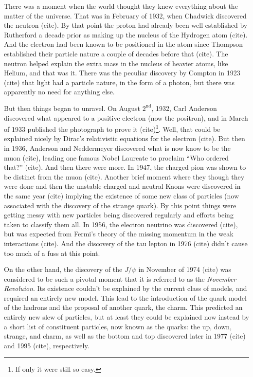 There was a moment when the world thought they knew everything
about the matter of the universe. That was in February of 1932, when Chadwick discovered the
neutron (cite). By that point the proton had already been 
well established by Rutherford a decade prior as 
making up the nucleus of the Hydrogen
atom (cite). And the electron had been known to be positioned in the atom
since Thompson established their particle nature a couple of decades before
that (cite). The neutron helped explain the extra mass in the nucleus of heavier
atoms, like Helium, and that was it. There was the peculiar discovery 
by Compton in 1923 (cite) that light had a particle nature, in the form of a photon,
but there was apparently no need for anything else. 


But then things began to unravel. On August $2^{\textrm{nd}}$, 1932, Carl Anderson
discovered what appeared to a positive electron (now the positron), and in March of 1933 published 
the photograph to prove it (cite)\footnote{If only it were still so easy.}. 
Well, that could be explained nicely by Dirac's relativistic equations
for the electron (cite). But then in 1936, Anderson and Neddermeyer discovered
what is now know to be the muon (cite), leading one famous Nobel Laureate
to proclaim ``Who ordered that?'' (cite). And then there were more.
In 1947, the charged pion was shown to be distinct from the muon (cite).
Another brief moment where they though they were done and then the unstable
charged and neutral Kaons were discovered in the same year (cite) implying
the existence of some new class of particles (now associated with the discovery 
of the strange quark). By this point things were getting messy with new particles
being discovered regularly and efforts being taken to classify them all.
In 1956, the electron neutrino was discovered (cite), 
but was expected from Fermi's theory of the missing momentum 
in the weak interactions (cite).  And the discovery of the tau lepton
in 1976 (cite) didn't cause too much of a fuss at this point.


On the other hand, the discovery of the $J/\psi$ in November of
1974 (cite) was considered to be such a pivotal moment
that it is referred to as the \emph{November Revoluion}. 
Its existence couldn't be explained by the current class of models, and required an entirely
new model. This lead 
to the introduction of the 
quark model of the hadrons and the proposal of another quark, the charm.  
This predicted an entirely new slew of particles, but at least they could be explained
now instead by a short list of constituent particles, now known as the quarks: the up, down,
strange, and charm, as well as the bottom and top discovered later in 1977 (cite)
and 1995 (cite), respectively.


